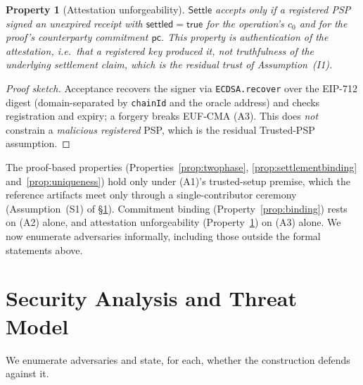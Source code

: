 \documentclass[11pt]{article}
\newtheorem{property}{Property}
\newcommand{\code}[1]{\texttt{#1}}
\begin{document}
\begin{property}[Attestation unforgeability]
\label{prop:auth}
$\mathsf{Settle}$ accepts only if a registered PSP signed an unexpired receipt
with $\mathsf{settled}=\mathsf{true}$ for the operation's $c_0$ and for the
proof's counterparty commitment $\mathsf{pc}$. This property is
\emph{authentication of the attestation}, i.e.\ that a registered key produced
it, not truthfulness of the underlying settlement claim, which is the residual
trust of Assumption~(I1).
\end{property}
\begin{proof}[Proof sketch]
Acceptance recovers the signer via \code{ECDSA.recover} over the EIP-712 digest
(domain-separated by \code{chainId} and the oracle address) and checks
registration and expiry; a forgery breaks EUF-CMA (A3). This does \emph{not}
constrain a \emph{malicious registered} PSP, which is the residual Trusted-PSP
assumption.
\end{proof}

The proof-based properties (Properties~\ref{prop:twophase},
\ref{prop:settlementbinding} and~\ref{prop:uniqueness}) hold only under (A1)'s
trusted-setup premise, which the reference artifacts meet only through a
single-contributor ceremony (Assumption~(S1) of \S\ref{sec:security}).
Commitment binding (Property~\ref{prop:binding}) rests on (A2) alone, and
attestation unforgeability (Property~\ref{prop:auth}) on (A3) alone. We now
enumerate adversaries informally,
including those outside the formal statements above.

\section{Security Analysis and Threat Model}
\label{sec:security}

We enumerate adversaries and state, for each, whether the construction defends
against it.
\end{document}
